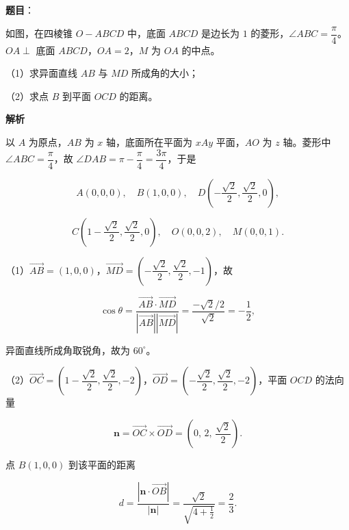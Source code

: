 \begin{answer}

\textbf{题目}：

如图，在四棱锥 $O-ABCD$ 中，底面 $ABCD$ 是边长为 $1$ 的菱形，$\angle ABC=\dfrac{\pi}{4}$。$OA\perp$ 底面 $ABCD$，$OA=2$，$M$ 为 $OA$ 的中点。

（1）求异面直线 $AB$ 与 $MD$ 所成角的大小；

（2）求点 $B$ 到平面 $OCD$ 的距离。
\nopagebreak[4]
\begin{center}\end{center}
\nopagebreak[4]
\textbf{解析}

以 $A$ 为原点，$AB$ 为 $x$ 轴，底面所在平面为 $xAy$ 平面，$AO$ 为 $z$ 轴。菱形中 $\angle ABC=\dfrac{\pi}4$，故 $\angle DAB=\pi-\dfrac{\pi}4=\dfrac{3\pi}4$，于是

\nopagebreak[4]
\[A(0,0,0),\quad B(1,0,0),\quad D\left(-\frac{\sqrt2}2,\frac{\sqrt2}2,0\right),\]

\nopagebreak[4]
\[C\left(1-\frac{\sqrt2}2,\frac{\sqrt2}2,0\right),\quad O(0,0,2),\quad M(0,0,1).\]

（1）$\overrightarrow{AB}=(1,0,0)$，$\overrightarrow{MD}=\left(-\dfrac{\sqrt2}2,\dfrac{\sqrt2}2,-1\right)$，故

\nopagebreak[4]
\[\cos\theta=\frac{\overrightarrow{AB}\cdot\overrightarrow{MD}}{\left|\overrightarrow{AB}\right|\left|\overrightarrow{MD}\right|}=\frac{-\sqrt2/2}{\sqrt2}=-\frac12,\]

异面直线所成角取锐角，故为 $60^\circ$。

（2）$\overrightarrow{OC}=\left(1-\dfrac{\sqrt2}2,\dfrac{\sqrt2}2,-2\right)$，$\overrightarrow{OD}=\left(-\dfrac{\sqrt2}2,\dfrac{\sqrt2}2,-2\right)$，平面 $OCD$ 的法向量

\nopagebreak[4]
\[\boldsymbol n=\overrightarrow{OC}\times\overrightarrow{OD}=\left(0,\,2,\,\frac{\sqrt2}2\right).\]

点 $B(1,0,0)$ 到该平面的距离

\nopagebreak[4]
\[d=\frac{\left|\boldsymbol n\cdot\overrightarrow{OB}\right|}{\left|\boldsymbol n\right|}=\frac{\sqrt2}{\sqrt{4+\frac12}}=\frac23.\]


\end{answer}
